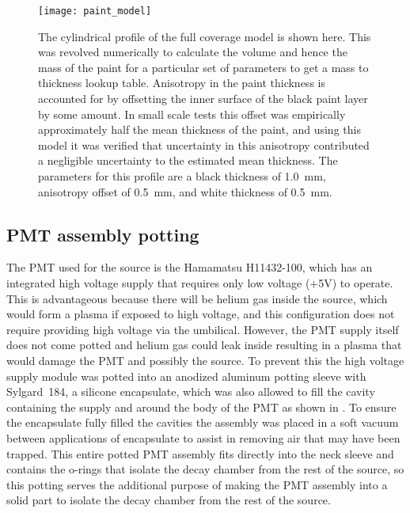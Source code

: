 \begin{figure}
\centering
\texttt{[image: paint\_model]}
\caption{The cylindrical profile of the full coverage model is shown here. This was revolved numerically to calculate the volume and hence the mass of the paint for a particular set of parameters to get a mass to thickness lookup table. Anisotropy in the paint thickness is accounted for by offsetting the inner surface of the black paint layer by some amount. In small scale tests this offset was empirically approximately half the mean thickness of the paint, and using this model it was verified that uncertainty in this anisotropy contributed a negligible uncertainty to the estimated mean thickness. The parameters for this profile are a black thickness of 1.0~mm, anisotropy offset of 0.5~mm, and white thickness of 0.5~mm. }
\label{fig:surfacemodel}
\end{figure}

\subsection{PMT assembly potting}
The PMT used for the source is the Hamamatsu H11432-100, which has an integrated high voltage supply that requires only low voltage (+5V) to operate. This is advantageous because there will be helium gas inside the source, which would form a plasma if exposed to high voltage, and this configuration does not require providing high voltage via the umbilical. However, the PMT supply itself does not come potted and helium gas could leak inside resulting in a plasma that would damage the PMT and possibly the source. To prevent this the high voltage supply module was potted into an anodized aluminum potting sleeve with Sylgard~184, a silicone encapsulate, which was also allowed to fill the cavity containing the supply and around the body of the PMT as shown in . To ensure the encapsulate fully filled the cavities the assembly was placed in a soft vacuum between applications of encapsulate to assist in removing air that may have been trapped. This entire potted PMT assembly fits directly into the neck sleeve and contains the o-rings that isolate the decay chamber from the rest of the source, so this potting serves the additional purpose of making the PMT assembly into a solid part to isolate the decay chamber from the rest of the source. 


